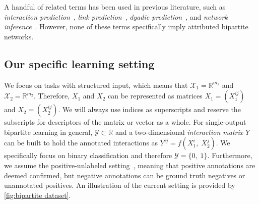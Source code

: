 \documentclass[sn-mathphys-num]{sn-jnl}%
\newcommand{\x}{\mathbf{x}}
\theoremstyle{thmstyleone}%
\theoremstyle{thmstyletwo}%
\theoremstyle{thmstylethree}%
\begin{document}
A handful of related terms has been used in previous literature, such as \emph{interaction prediction}~\cite{schrynemackers_classifying_2015,pliakos_network_2019,chen_machine_2018,bagherian_machine_2020}, \emph{link prediction}~\cite{lu_link_2011,zhou_progresses_2021}, \emph{dyadic prediction}~\cite{menon_log-linear_2010,pahikkala_two-step_2014,jin_multitask_2017}, and \emph{network inference}~\cite{park_flaws_2012,pahikkala_toward_2015,schrynemackers_protocols_2013,pliakos_network_2019}. However, none of these terms specifically imply attributed bipartite networks. 



\subsection{Our specific learning setting}
\label{sec:our setting}


We focus on tasks with structured input, which means that $\mathcal{X}_1 = \mathbb{R}^{m_1}$ and $\mathcal{X}_2 = \mathbb{R}^{m_2}$. Therefore, $X_1$ and $X_2$ can be represented as matrices $X_1=(X_1^{ij})$ and $X_2=(X_2^{ij})$. We will always use indices as superscripts and reserve the subscripts for descriptors of the matrix or vector as a whole.
%
For single-output bipartite learning in general, $\mathcal{Y} \subset \mathbb{R}$ and a two-dimensional \emph{interaction matrix} $Y$ can be built to hold the annotated interactions as $Y^{ij} = f(X_1^i,\; X_2^j)$.
%
%
We specifically focus on binary classification and therefore $\mathcal{Y}=\{0,\;1\}$. Furthermore, we assume the positive-unlabeled setting~\cite{bekker_learning_2020}, meaning that positive annotations are deemed confirmed, but negative annotations can be ground truth negatives or unannotated positives.
%
An illustration of the current setting is provided by \autoref{fig:bipartite dataset}.
\end{document}
